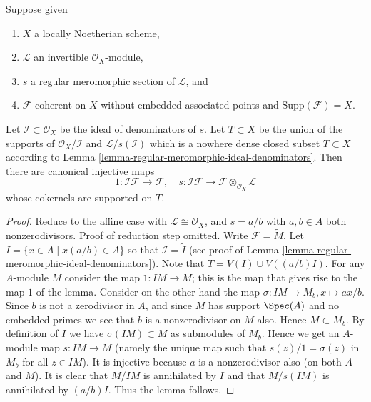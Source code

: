 \begin{lemma}
\label{lemma-make-maps-regular-section}
Suppose given
\begin{enumerate}
\item $X$ a locally Noetherian scheme,
\item $\mathcal{L}$ an invertible $\mathcal{O}_X$-module,
\item $s$ a regular meromorphic section of $\mathcal{L}$, and
\item $\mathcal{F}$ coherent on $X$
without embedded associated points and $\text{Supp}(\mathcal{F}) = X$.
\end{enumerate}
Let $\mathcal{I} \subset \mathcal{O}_X$ be the ideal of
denominators of $s$. Let $T \subset X$ be the union
of the supports of $\mathcal{O}_X/\mathcal{I}$ and
$\mathcal{L}/s(\mathcal{I})$ which is a nowhere dense closed
subset $T \subset X$ according to
Lemma \ref{lemma-regular-meromorphic-ideal-denominators}.
Then there are canonical injective maps
$$
1 : \mathcal{I}\mathcal{F} \to \mathcal{F}, \quad
s : \mathcal{I}\mathcal{F} \to \mathcal{F} \otimes_{\mathcal{O}_X}\mathcal{L}
$$
whose cokernels are supported on $T$.
\end{lemma}

\begin{proof}
Reduce to the affine case with $\mathcal{L} \cong \mathcal{O}_X$,
and $s = a/b$ with $a, b \in A$ both nonzerodivisors.
Proof of reduction step omitted.
Write $\mathcal{F} = \widetilde{M}$.
Let $I = \{x \in A \mid x(a/b) \in A\}$
so that $\mathcal{I} = \widetilde{I}$ (see
proof of Lemma \ref{lemma-regular-meromorphic-ideal-denominators}).
Note that $T = V(I) \cup V((a/b)I)$.
For any $A$-module $M$ consider the map $1 : IM \to M$; this is the
map that gives rise to the map $1$ of the lemma.
Consider on the other hand the map
$\sigma : IM \to M_b, x \mapsto ax/b$.
Since $b$ is not a zerodivisor in $A$, and since
$M$ has support $\Spec(A)$ and no embedded primes we
see that $b$ is a nonzerodivisor on $M$ also. Hence $M \subset M_b$.
By definition of $I$ we have $\sigma(IM) \subset M$ as submodules
of $M_b$. Hence we get an $A$-module map $s : IM \to M$ (namely the
unique map such that $s(z)/1 = \sigma(z)$ in $M_b$ for all $z \in IM$).
It is injective because $a$ is a nonzerodivisor also (on both $A$ and $M$).
It is clear that $M/IM$ is annihilated by $I$ and that
$M/s(IM)$ is annihilated by $(a/b)I$. Thus the lemma follows.
\end{proof}






